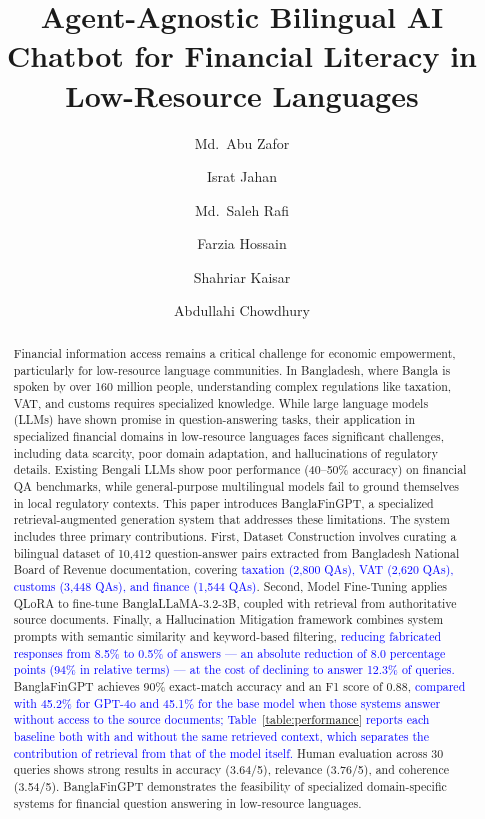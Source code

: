 \documentclass{article}
\title{Agent-Agnostic Bilingual AI Chatbot for Financial Literacy in Low-Resource Languages}
\author[1*]{Md.~Abu Zafor}
\author[1]{Israt Jahan}
\author[1]{Md.~Saleh Rafi}
\author[1]{Farzia Hossain}
\author[2]{Shahriar Kaisar}
\author[3]{Abdullahi Chowdhury}
\affil[1]{Department of Computer Science and Engineering, East West University, Dhaka, Bangladesh.}
\affil[2]{Department of Information Systems and Business Analytics, RMIT University, Melbourne, Australia.}
\affil[3]{Adelaide University Online and Learning Futures, Adelaide University, Adelaide, Australia.}
\affil[*]{Address correspondence to: zafor.cseewubd2020@gmail.com}
\date{}
\newcommand{\revised}[1]{\textcolor{blue}{#1}}
\newcommand{\revised}[1]{#1}
\begin{document}
\maketitle

\begin{abstract}
Financial information access remains a critical challenge for economic empowerment,
particularly for low-resource language communities. In Bangladesh, where Bangla is
spoken by over 160 million people, understanding complex regulations like taxation,
VAT, and customs requires specialized knowledge. While large language models (LLMs)
have shown promise in question-answering tasks, their application in specialized
financial domains in low-resource languages faces significant challenges, including
data scarcity, poor domain adaptation, and hallucinations of regulatory details.
Existing Bengali LLMs show poor performance (40--50\% accuracy) on financial QA
benchmarks, while general-purpose multilingual models fail to ground themselves in
local regulatory contexts. This paper introduces BanglaFinGPT, a specialized
retrieval-augmented generation system that addresses these limitations. The system
includes three primary contributions. First, Dataset Construction involves curating a
bilingual dataset of 10,412 question-answer pairs extracted from Bangladesh National
Board of Revenue documentation, covering \revised{taxation (2,800 QAs), VAT (2,620 QAs),
customs (3,448 QAs), and finance (1,544 QAs)}. Second, Model Fine-Tuning applies QLoRA
to fine-tune BanglaLLaMA-3.2-3B, coupled with retrieval from authoritative source
documents. Finally, a Hallucination Mitigation framework combines system prompts with
semantic similarity and keyword-based filtering, \revised{reducing fabricated
responses from 8.5\% to 0.5\% of answers --- an absolute reduction of 8.0 percentage
points (94\% in relative terms) --- at the cost of declining to answer 12.3\% of
queries.} BanglaFinGPT achieves 90\% exact-match accuracy and an F1 score of 0.88,
\revised{compared with 45.2\% for GPT-4o and 45.1\% for the base model when those
systems answer without access to the source documents; Table~\ref{table:performance}
reports each baseline both with and without the same retrieved context, which
separates the contribution of retrieval from that of the model itself.} Human
evaluation across 30 queries shows strong results in accuracy (3.64/5), relevance
(3.76/5), and coherence (3.54/5). BanglaFinGPT demonstrates the feasibility of
specialized domain-specific systems for financial question answering in low-resource
languages.
\end{abstract}
\end{document}
